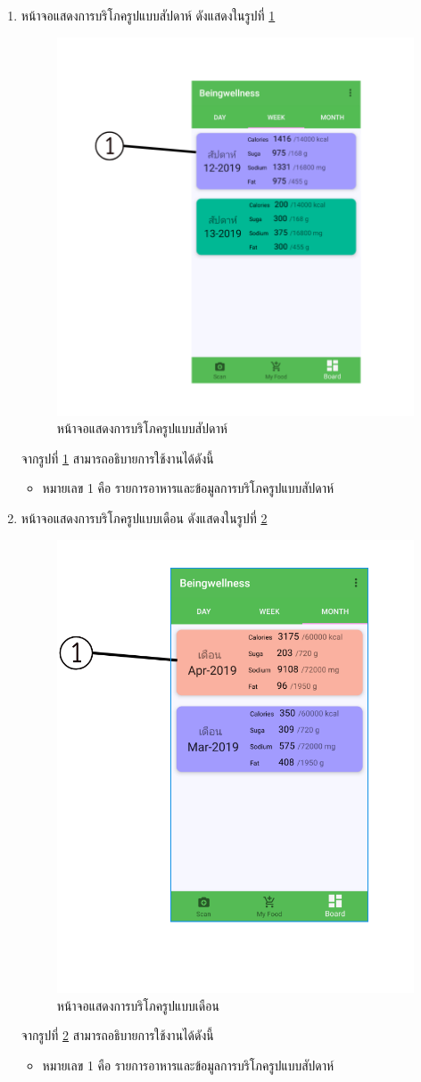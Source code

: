 \begin{enumerate}
			\item  หน้าจอแสดงการบริโภครูปแบบสัปดาห์ ดังแสดงในรูปที่ \ref{Fig:week}
			\begin{figure}[H]
				\centering
				\includegraphics[width=0.5\columnwidth]{Figures/7/teach/4.png}
				\caption{หน้าจอแสดงการบริโภครูปแบบสัปดาห์}
				\label{Fig:week}
			\end{figure}
		จากรูปที่ \ref{Fig:week} สามารถอธิบายการใช้งานได้ดังนี้
			\begin{itemize}[label={--}]
				\item หมายเลข 1 คือ รายการอาหารและข้อมูลการบริโภครูปแบบสัปดาห์
				\end{itemize}
			
				\item  หน้าจอแสดงการบริโภครูปแบบเดือน ดังแสดงในรูปที่ \ref{Fig:Month}
				\begin{figure}[H]
					\centering
					\includegraphics[width=0.5\columnwidth]{Figures/7/teach/5.png}
					\caption{หน้าจอแสดงการบริโภครูปแบบเดือน}
					\label{Fig:Month}
				\end{figure}
			จากรูปที่ \ref{Fig:Month} สามารถอธิบายการใช้งานได้ดังนี้
				\begin{itemize}[label={--}]
					\item หมายเลข 1 คือ รายการอาหารและข้อมูลการบริโภครูปแบบสัปดาห์
					\end{itemize}
			

\end{enumerate}
